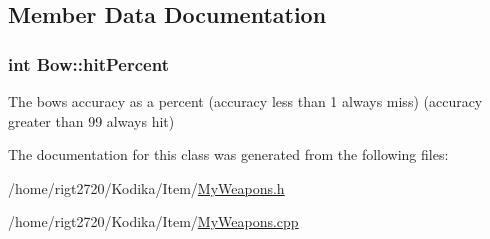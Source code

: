 \subsection{Member Data Documentation}
\hypertarget{classBow_ab6156932e51ec7833d07a669e5e346ff}{
\subsubsection[{hit\-Percent}]{\setlength{\rightskip}{0pt plus 5cm}int Bow\-::hit\-Percent\hspace{0.3cm}{\ttfamily [protected]}}}\label{classBow_ab6156932e51ec7833d07a669e5e346ff}
The bows accuracy as a percent (accuracy less than 1 always miss) (accuracy greater than 99 always hit) 

The documentation for this class was generated from the following files\-:\begin{DoxyCompactItemize}
\item 
/home/rigt2720/\-Kodika/\-Item/\hyperlink{MyWeapons_8h}{My\-Weapons.\-h}\item 
/home/rigt2720/\-Kodika/\-Item/\hyperlink{MyWeapons_8cpp}{My\-Weapons.\-cpp}\end{DoxyCompactItemize}
